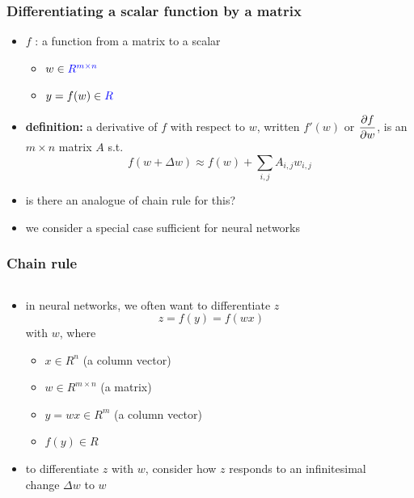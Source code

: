 \documentclass[12pt,dvipdfmx]{beamer}
\newcommand{\ao}[1]{{\color{blue}#1}}
\begin{document}
\begin{frame}
\frametitle{Differentiating a scalar function by a matrix}
\begin{itemize}
\item $f$ : a function from a matrix to a scalar
  \begin{itemize}
  \item $w \in \ao{R^{m\times n}}$
  \item $y = f(w) \in \ao{R}$
  \end{itemize}

\item \ao{\textbf{definition:}} a derivative of $f$ with respect to $w$, 
  written $f'(w)$ or ${\displaystyle \frac{\partial f}{\partial w}}$, is 
  \ao{an $m \times n$ matrix $A$} s.t.
  \[ f(w + \Delta w) \approx f(w) + \sum_{i,j} A_{i,j} w_{i,j} \]
\item is there an analogue of chain rule for this?
\item we consider a special case sufficient for neural networks
\end{itemize}
\end{frame}

\begin{frame}
\frametitle{Chain rule}
\begin{columns}
\begin{column}{0.6\textwidth}

\begin{itemize}
\item in neural networks, we often want to differentiate $z$
\[ z = f(y) = f(w x) \]
with $w$, where
\begin{itemize}
\item $x \in R^n$ (a column vector)
\item $w \in R^{m\times n}$ (a matrix) 
\item $y = w x \in R^m$ (a column vector) 
\item $f(y) \in R$
\end{itemize}

\item to differentiate $z$ with $w$, 
  consider how $z$ responds to an infinitesimal change $\Delta w$ to $w$
\end{itemize}
\end{column}

\begin{column}{0.4\textwidth}
\begin{center}
\def\svgheight{\textheight}
{\scriptsize}
\end{center}
\end{column}  
\end{columns}
\end{frame}
\end{document}
